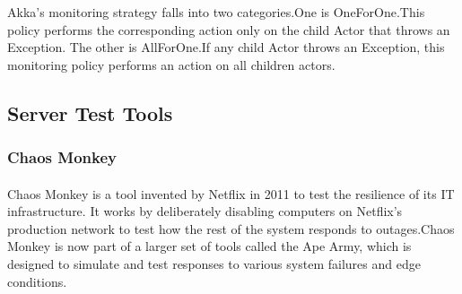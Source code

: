 \documentclass{article}
\begin{document}
Akka's monitoring strategy falls into two categories.One is OneForOne.This policy performs the corresponding action only on the child Actor that throws an Exception. The other is AllForOne.If any child Actor throws an Exception, this monitoring policy performs an action on all children actors.

\subsection{Server Test Tools}\vspace{18pt}
\subsubsection{Chaos Monkey}\vspace{16pt}
\paragraph{}\vspace{11pt}\justifying
Chaos Monkey is a tool invented by Netflix in 2011 to test the resilience of its IT infrastructure\cite{bennett2012chaos}. It works by deliberately disabling computers on Netflix's production network to test how the rest of the system responds to outages.Chaos Monkey is now part of a larger set of tools called the Ape Army, which is designed to simulate and test responses to various system failures and edge conditions.\\

\newpage


\end{document}
